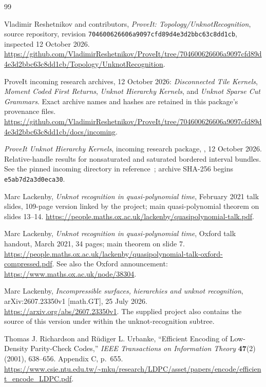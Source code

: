 \begin{thebibliography}{99}
\raggedright
{}

Vladimir Reshetnikov and contributors,
\emph{ProveIt: Topology/UnknotRecognition}, source repository,
revision \texttt{704600626606a9097cfd89d4e3d2bbc63c8dd1cb},
inspected 12 October 2026.
\url{https://github.com/VladimirReshetnikov/ProveIt/tree/704600626606a9097cfd89d4e3d2bbc63c8dd1cb/Topology/UnknotRecognition}.

ProveIt incoming research archives, 12 October 2026:
\emph{Disconnected Tile Kernels},
\emph{Moment Coded First Returns},
\emph{Unknot Hierarchy Kernels}, and
\emph{Unknot Sparse Cut Grammars}.
Exact archive names and hashes are retained in this package's provenance files.
\url{https://github.com/VladimirReshetnikov/ProveIt/tree/704600626606a9097cfd89d4e3d2bbc63c8dd1cb/docs/incoming}.

\emph{ProveIt Unknot Hierarchy Kernels}, incoming research package,
,
12 October 2026. Relative-handle results for nonsaturated and saturated
bordered interval bundles. See the pinned incoming directory in
reference~\cite{incoming}; archive SHA-256 begins \texttt{e5ab7d2a3d0eca30}.

Marc Lackenby,
\emph{Unknot recognition in quasi-polynomial time},
February 2021 talk slides, 109-page version linked by the project;
main quasi-polynomial theorem on slides 13--14.
\url{https://people.maths.ox.ac.uk/lackenby/quasipolynomial-talk.pdf}.

Marc Lackenby,
\emph{Unknot recognition in quasi-polynomial time},
Oxford talk handout, March 2021, 34 pages; main theorem on slide 7.
\url{https://people.maths.ox.ac.uk/lackenby/quasipolynomial-talk-oxford-compressed.pdf}.
See also the Oxford announcement:
\url{https://www.maths.ox.ac.uk/node/38304}.

Marc Lackenby,
\emph{Incompressible surfaces, hierarchies and unknot recognition},
arXiv:2607.23350v1 [math.GT], 25 July 2026.
\url{https://arxiv.org/abs/2607.23350v1}.
The supplied project also contains the source of this version under
 within the unknot-recognition subtree.

Thomas J. Richardson and R{\"u}diger L. Urbanke,
``Efficient Encoding of Low-Density Parity-Check Codes,''
\emph{IEEE Transactions on Information Theory} \textbf{47}(2)
(2001), 638--656. Appendix C, p.~655.
\url{https://www.csie.ntu.edu.tw/~mku/research/LDPC/asset/papers/encode/efficient_encode_LDPC.pdf}.


\end{thebibliography}
